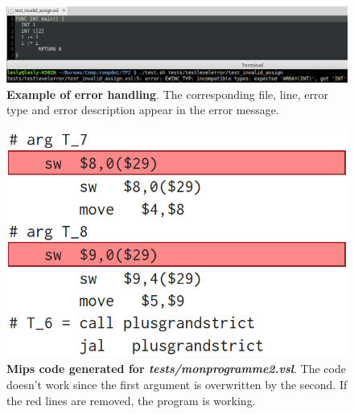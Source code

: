 \documentclass[a4paper,11pt,english]{article}
\begin{document}
\begin{figure}
\centering
\includegraphics[scale=0.5]{error}
\caption{
  \textbf{Example of error handling}.
  The corresponding file, line, error type and error description appear in the error message.}
  \label{fig.error}
\end{figure}

\begin{figure}
\centering
\includegraphics[scale=0.4]{diff}
\caption{
  \textbf{Mips code generated for \textit{tests/monprogramme2.vsl}}.
  The code doesn't work since the first argument is overwritten by the second.
  If the red lines are removed, the program is working.}
  \label{fig.mips}
\end{figure}
\end{document}
